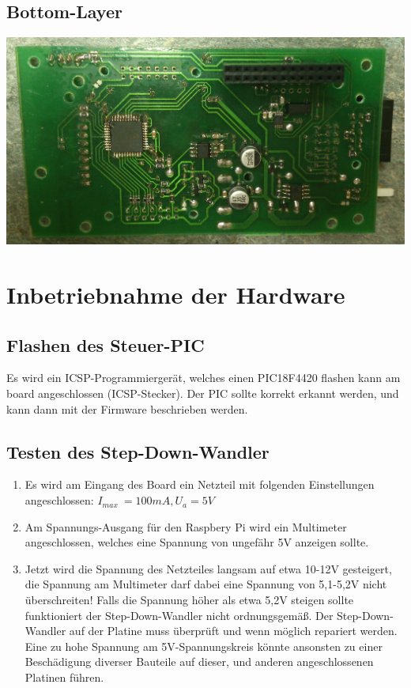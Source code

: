 \documentclass[a4paper,10pt]{article}
\begin{document}
\subsection{Bottom-Layer}

\includegraphics[width=\textwidth]{pointhiboard_board_bottom} \\

\newpage

\section{Inbetriebnahme der Hardware}

\subsection{Flashen des Steuer-PIC}

Es wird ein ICSP-Programmiergerät, welches einen PIC18F4420 flashen kann am board angeschlossen (ICSP-Stecker). Der PIC sollte korrekt erkannt werden, und kann dann mit der Firmware beschrieben werden.

\subsection{Testen des Step-Down-Wandler}

\begin{enumerate}
 \item Es wird am Eingang des Board ein Netzteil mit folgenden Einstellungen angeschlossen: $I_{max} ~= 100mA, U_a = 5V$
 \item Am Spannungs-Ausgang für den Raspbery Pi wird ein Multimeter angeschlossen, welches eine Spannung von ungefähr 5V anzeigen sollte.
 \item Jetzt wird die Spannung des Netzteiles langsam auf etwa 10-12V gesteigert, die Spannung am Multimeter darf dabei eine Spannung von 5,1-5,2V nicht überschreiten!
Falls die Spannung höher als etwa 5,2V steigen sollte funktioniert der Step-Down-Wandler nicht ordnungsgemäß. Der Step-Down-Wandler auf der Platine muss überprüft und wenn möglich repariert werden. Eine zu hohe Spannung am 5V-Spannungskreis könnte ansonsten zu einer Beschädigung diverser Bauteile auf dieser, und anderen angeschlossenen Platinen führen.
\end{enumerate}
\end{document}
